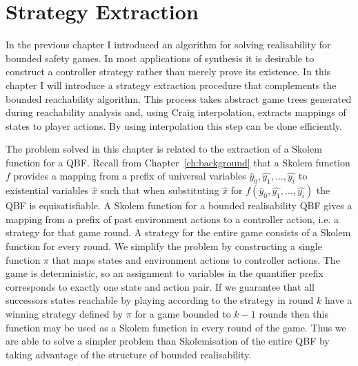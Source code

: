 \chapter{Strategy Extraction}
\label{ch:strategy}

\newcommand{\strategyext}[0]{\textsc{strategyGen}\xspace}
\newcommand{\genstrategy}{\textsc{strategyGen}}
\newcommand{\strategy}[0]{\textsc{strategy}\xspace}
\newcommand{\partition}[0]{\textsc{partition}\xspace}
\newcommand{\ogametree}[0]{\mbox{\sc OppGT}}
\newcommand{\eagametree}[0]{\mbox{\sc AbsGT}'}
\newcommand{\pgametree}[0]{\mbox{\sc Cand}}
\newcommand{\apgametree}[0]{\mbox{\sc AbsSolvedGT}}
\newcommand{\opgametree}[0]{\mbox{\sc Spoiling}}

\newcommand{\opptf}[0]{\textsc{\textoverline{treeFormula}}\xspace}

\newcommand{\clk}[0]{\texttt{clk}}
\newcommand{\curr}[0]{\texttt{curr}}
\newcommand{\err}[0]{\texttt{err}}
\newcommand{\nex}[0]{\texttt{next}}
\newcommand{\inp}[0]{\texttt{in}}

In the previous chapter I introduced an algorithm for solving realisability for bounded safety games. In most applications of synthesis it is desirable to construct a controller strategy rather than merely prove its existence. In this chapter I will introduce a strategy extraction procedure that complements the bounded reachability algorithm. This process takes abstract game trees generated during reachability analysis and, using Craig interpolation, extracts mappings of states to player actions. By using interpolation this step can be done efficiently.

The problem solved in this chapter is related to the extraction of a Skolem function for a QBF. Recall from Chapter~\ref{ch:background} that a Skolem function $f$ provides a mapping from a prefix of universal variables $\hat{y}_0, \hat{y_1}, \ldots, \hat{y_i}$ to existential variables $\hat{x}$ such that when substituting $\hat{x}$ for $f(\hat{y}_0, \hat{y_1}, \ldots, \hat{y_i})$ the QBF is equisatisfiable. A Skolem function for a bounded realisability QBF gives a mapping from a prefix of past environment actions to a controller action, i.e. a strategy for that game round. A strategy for the entire game consists of a Skolem function for every round. We simplify the problem by constructing a single function $\pi$ that maps states and environment actions to controller actions. The game is deterministic, so an assignment to variables in the quantifier prefix corresponds to exactly one state and action pair.  If we guarantee that all successors states reachable by playing according to the strategy in round $k$ have a winning strategy defined by $\pi$ for a game bounded to $k-1$ rounds then this function may be used as a Skolem function in every round of the game. Thus we are able to solve a simpler problem than Skolemisation of the entire QBF by taking advantage of the structure of bounded realisability.

